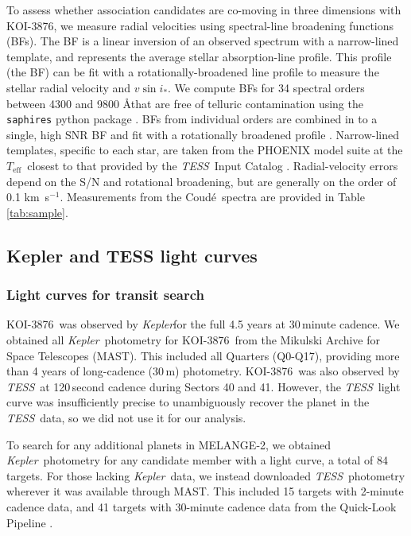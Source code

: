 \documentclass[twocolumn]{aastex631}
\newcommand{\name}{KOI-3876}
\newcommand{\starname}{KOI-3876}
\newcommand{\vsini}{$v\sin{i_*}$}
\newcommand{\kepler}{{\it Kepler}}
\newcommand{\teff}{\ensuremath{T_{\text{eff}}}}
\newcommand\kms{km~s$^{-1}$}
\newcommand{\tess}{\textit{TESS}}
\newcommand{\association}{MELANGE-2}
\newcommand{\coude}{Coud{\'e}}
\begin{document}
To assess whether association candidates are co-moving in three dimensions with \name, we measure radial velocities using spectral-line broadening functions (BFs). The BF is a linear inversion of an observed spectrum with a narrow-lined template, and represents the average stellar absorption-line profile. This profile (the BF) can be fit with a rotationally-broadened line profile to measure the stellar radial velocity and \vsini. We compute BFs for 34 spectral orders between 4300 and 9800 \AA that are free of telluric contamination using the {\tt saphires} python package \citep{Tofflemireetal2019}. BFs from individual orders are combined in to a single, high SNR BF and fit with a rotationally broadened profile \citep{Gray1992}. Narrow-lined templates, specific to each star, are taken from the \citet{2013A&A...553A...6H} PHOENIX model suite at the \teff\ closest to that provided by the \tess\ Input Catalog \citep[v8.0;][]{TIC2019}. Radial-velocity errors depend on the S/N and rotational broadening, but are generally on the order of 0.1 \kms. Measurements from the \coude\ spectra are provided in Table \ref{tab:sample}.

\subsection{Kepler and TESS light curves}\label{sec:lc}

\subsubsection{Light curves for transit search}
\starname\ was observed by \kepler for the full 4.5 years at 30\,minute cadence. We obtained all \kepler\ photometry for \starname\ from the Mikulski Archive for Space Telescopes (MAST). This included all Quarters (Q0-Q17), providing more than 4 years of long-cadence (30\,m) photometry. \starname\ was also observed by \tess\ at 120\,second cadence during Sectors 40 and 41. However, the \tess\ light curve was insufficiently precise to unambiguously recover the planet in the \tess\ data, so we did not use it for our analysis. 

To search for any additional planets in \association, we obtained \kepler\ photometry for any candidate member with a light curve, a total of 84 targets. For those lacking \kepler\ data, we instead downloaded \tess\ photometry wherever it was available through MAST. This included 15 targets with 2-minute cadence data, and 41 targets with 30-minute cadence data from the Quick-Look Pipeline \citep[QLP;][]{2020RNAAS...4..204H}. 
\end{document}
